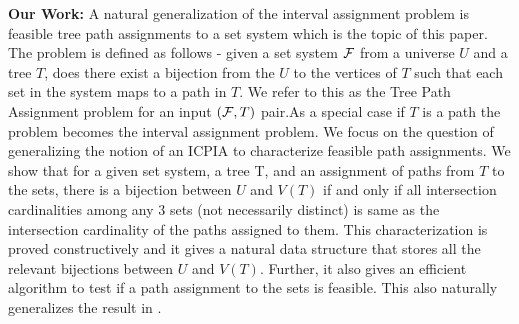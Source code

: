\documentclass{llncs}
\def\cF{{\cal F}}
\begin{document}
\noindent
{\bf Our Work:}
A natural generalization of the interval assignment problem is
feasible tree path assignments to a set system which is the topic of
this paper. The problem is defined as follows - given a set system $\cF$
from a universe $U$ and a tree $T$, does  there exist a bijection from the
$U$ to the vertices of $T$ such that each set in the system maps to a
path in $T$.  We refer to this as the Tree Path Assignment problem for an input $(\cF,T)$ pair.As a special case if $T$ is a path the problem becomes
the interval assignment problem.  We focus on the question of generalizing the notion
of an ICPIA \cite{nsnrs09} to characterize feasible path assignments.  We show that
for a given set system, a tree T, and an assignment of paths from $T$ to the sets, there is a bijection
between $U$ and $V(T)$ if and only if all intersection cardinalities among any 3 sets (not necessarily distinct) is same as the intersection cardinality of the paths assigned to them.  This
characterization is proved constructively and it gives a natural data structure that stores all the relevant
bijections between $U$ and $V(T)$.  Further, it also gives an efficient algorithm to test if a path assignment to the
sets is feasible.  This also naturally generalizes the result in \cite{nsnrs09}.  
 
\end{document}
